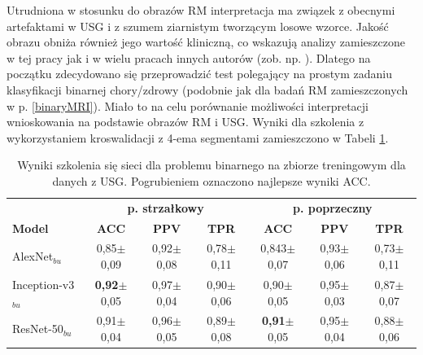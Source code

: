 Utrudniona w stosunku do obrazów RM interpretacja ma związek z obecnymi artefaktami w USG i z szumem ziarnistym tworzącym losowe wzorce. Jakość obrazu obniża również jego wartość kliniczną, co wskazują analizy zamieszczone w tej pracy jak i w wielu pracach innych autorów (zob. np. \cite{Khan2003, Ibrahim2013}). Dlatego na początku zdecydowano się przeprowadzić test polegający na prostym zadaniu klasyfikacji binarnej chory/zdrowy (podobnie jak dla badań RM zamieszczonych w p. \ref{binaryMRI}). Miało \linebreak to na celu porównanie możliwości interpretacji wnioskowania na podstawie obrazów RM i USG. Wyniki dla szkolenia z wykorzystaniem kroswalidacji z 4-ema segmentami zamieszczono w Tabeli \ref{tab:usg-binary}.
\renewcommand{\arraystretch}{1.2}
\begin{table}[]
	\centering
	\scriptsize
	\setlength{\tabcolsep}{3pt}
	\setlength\extrarowheight{2pt}
	\caption{Wyniki szkolenia się sieci dla problemu binarnego na zbiorze treningowym dla danych z USG. Pogrubieniem oznaczono najlepsze wyniki ACC.}
	\label{tab:usg-binary}
	\begin{tabular}{l||c|c|c||c|c|c}
		& \multicolumn{3}{c}{\textbf{p. strzałkowy}} & \multicolumn{3}{c}{\textbf{p. poprzeczny}} \\
		\textbf{Model} & \textbf{ACC} & \textbf{PPV} & \textbf{TPR} & \textbf{ACC} & \textbf{PPV} & \textbf{TPR} \\ \hline \hline
		AlexNet$_{bu}$ & 0,85$\pm$0,09 & 0,92$\pm$0,08 & 0,78$\pm$0,11 & 0,843$\pm$0,07 & 0,93$\pm$0,06 & 0,73$\pm$0,11  \\ \hline
		Inception-v3$_{bu}$ & \textbf{0,92}$\pm$0,05 & 0,97$\pm$0,04 & 0,90$\pm$0,06 & 0,90$\pm$0,05 & 0,95$\pm$0,03 & 0,87$\pm$0,07 \\ \hline
		ResNet-50$_{bu}$ & 0,91$\pm$0,04 & 0,96$\pm$0,05 & 0,89$\pm$0,08 & \textbf{0,91}$\pm$0,05 & 0,95$\pm$0,04 & 0,88$\pm$0,06 \\ 
	\end{tabular}
\end{table}
\renewcommand{\arraystretch}{1}

